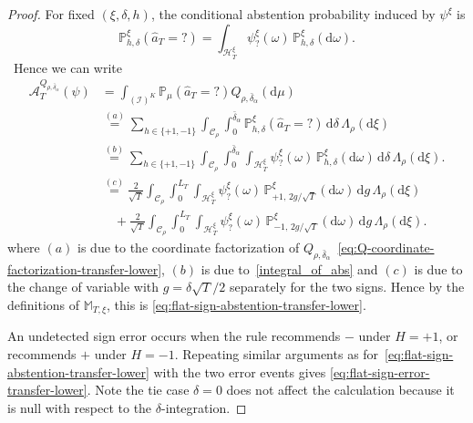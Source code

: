 \documentclass[10pt]{article}
\newcommand{\dd}{\mathrm{d}}
\theoremstyle{plain}
\begin{document}
\begin{proof}
For fixed $(\xi,\delta,h)$, the conditional abstention probability induced
by $\psi^\xi$ is
\begin{equation} \label{integral_of_abs}
    \mathbb P_{h,\delta}^{\xi}(\hat a_T=?)
    =
    \int_{\mathcal H_T^\xi}
        \psi_?^\xi(\omega)
    \,\mathbb P_{h,\delta}^{\xi}(\dd\omega).
\end{equation}\
Hence we can write
\[
\begin{aligned}
    \mathcal A_T^{Q_{\rho,\bar\delta_\alpha}}(\psi)
    &= \int_{(\mathcal I)^K} \mathbb P_\mu(\hat a_T =?) Q_{\rho, \bar\delta_\alpha}(\dd \mu) \\
    &\stackrel{(a)}{=}
    \sum_{h\in\{+1,-1\}}
    \int_{\mathcal C_\rho}
    \int_0^{\bar\delta_\alpha}
        \mathbb P_{h,\delta}^{\xi}
        (\hat a_T=?)
    \,\dd\delta\,
    \Lambda_\rho(\dd\xi)\\
    &\stackrel{(b)}{=}
    \sum_{h\in\{+1,-1\}}
    \int_{\mathcal C_\rho}
    \int_0^{\bar\delta_\alpha}
    \int_{\mathcal H_T^\xi}
        \psi_?^\xi(\omega)
    \,\mathbb P_{h,\delta}^{\xi}(\dd\omega)
    \,\dd\delta\,
    \Lambda_\rho(\dd\xi).\\
    &\stackrel{(c)}{=}
    \frac{2}{\sqrt T}
    \int_{\mathcal C_\rho}
    \int_0^{L_T}
    \int_{\mathcal H_T^\xi}
        \psi_?^\xi(\omega)
    \,\mathbb P_{+1,\,2g/\sqrt T}^{\xi}(\dd\omega)
    \,\dd g\,
    \Lambda_\rho(\dd\xi)\\
    &\quad+
    \frac{2}{\sqrt T}
    \int_{\mathcal C_\rho}
    \int_0^{L_T}
    \int_{\mathcal H_T^\xi}
        \psi_?^\xi(\omega)
    \,\mathbb P_{-1,\,2g/\sqrt T}^{\xi}(\dd\omega)
    \,\dd g\,
    \Lambda_\rho(\dd\xi).
\end{aligned}
\]
where $(a)$ is due to the coordinate factorization of $Q_{\rho, \bar\delta_\alpha}$~\eqref{eq:Q-coordinate-factorization-transfer-lower}, $(b)$ is due to~\eqref{integral_of_abs} and $(c)$ is due to the change of variable with $g=\delta\sqrt T/2$ separately for the two signs. Hence by the definitions of $\mathbb M_{T,\xi}$, this is \eqref{eq:flat-sign-abstention-transfer-lower}.

An undetected sign error occurs when the rule recommends $-$ under
$H=+1$, or recommends $+$ under $H=-1$. Repeating similar arguments as for~\eqref{eq:flat-sign-abstention-transfer-lower} with the two error events gives \eqref{eq:flat-sign-error-transfer-lower}. Note the tie case $\delta=0$ does not
affect the calculation because it is null with respect to the
$\delta$-integration.


\end{proof}
\end{document}
